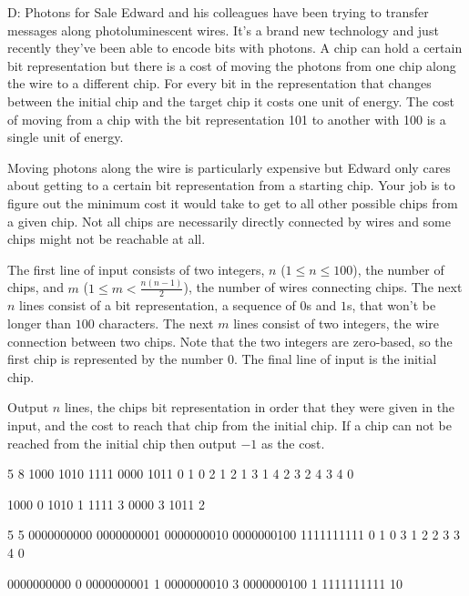 \begin{problem}{D: Photons for Sale}
Edward and his colleagues have been trying to transfer messages along photoluminescent wires.
It's a brand new technology and just recently they've been able to encode bits with photons.
A chip can hold a certain bit representation but there is a cost of moving the photons from one chip along the wire to a different chip.
For every bit in the representation that changes between the initial chip and the target chip it costs one unit of energy.
The cost of moving from a chip with the bit representation 101 to another with 100 is a single unit of energy.

Moving photons along the wire is particularly expensive but Edward only cares about getting to a certain bit representation from a starting chip.
Your job is to figure out the minimum cost it would take to get to all other possible chips from a given chip.
Not all chips are necessarily directly connected by wires and some chips might not be reachable at all.
\end{problem}

\begin{formalin}
The first line of input consists of two integers, $n$ ($1 \leq n \leq 100$), the number of chips, and $m$ ($1 \leq m < \frac{n(n-1)}{2}$), the number of wires connecting chips.
The next $n$ lines consist of a bit representation, a sequence of $0$s and $1$s, that won't be longer than $100$ characters.
The next $m$ lines consist of two integers, the wire connection between two chips.
Note that the two integers are zero-based, so the first chip is represented by the number $0$.
The final line of input is the initial chip.
\end{formalin}

\begin{formalout}
Output $n$ lines, the chips bit representation in order that they were given in the input, and the cost to reach that chip from the initial chip.
If a chip can not be reached from the initial chip then output $-1$ as the cost.
\end{formalout}

\begin{datain}
5 8
1000
1010
1111
0000
1011
0 1
0 2
1 2
1 3
1 4
2 3
2 4
3 4
0
\end{datain}
\begin{dataout}
1000 0
1010 1
1111 3
0000 3
1011 2
\end{dataout}
\begin{datain}
5 5
0000000000
0000000001
0000000010
0000000100
1111111111
0 1
0 3
1 2
2 3
3 4
0
\end{datain}
\begin{dataout}
0000000000 0
0000000001 1
0000000010 3
0000000100 1
1111111111 10
\end{dataout}
